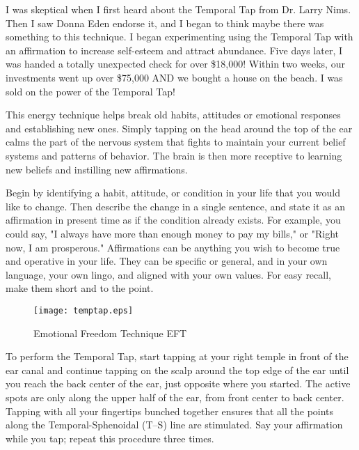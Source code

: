 \documentclass[../main.tex]{subfiles}
\begin{document}
\label{Ex:EFT}
I was skeptical when I first heard about the Temporal Tap from Dr. Larry Nims.
Then I saw Donna Eden endorse it, and I began to think maybe there was something to this technique.
I began experimenting using the Temporal Tap with an affirmation to increase self-esteem and attract abundance.
Five days later, I was handed a totally unexpected check for over \$18,000! Within two weeks, our investments went up over \$75,000 AND we bought a house on the beach.
I was sold on the power of the Temporal Tap!

This energy technique helps break old habits, attitudes
or emotional responses and establishing new ones.   
Simply tapping on the head around the top of the ear calms the part of the nervous system that fights to maintain
your current belief systems and patterns of behavior.
The brain is then more receptive to learning new beliefs and instilling new affirmations.

Begin by identifying a habit, attitude, or condition in your life that you would like to change.
Then describe the change in a single sentence, and state it as an affirmation in present time as if the condition already exists.
For example, you could say, "I always have more than enough money to pay my bills," or "Right now, I am prosperous."
Affirmations can be anything you wish to become true and operative in your life.
They can be specific or general, and in your own language, your own lingo, and aligned with your own values.
For easy recall, make them short and to the point.

\begin{figure}[htb]
  \centering
 \texttt{[image: temptap.eps]}      
\caption{Emotional Freedom Technique EFT}
\end{figure}

To perform the Temporal Tap, start tapping at your right temple in front of the ear canal and continue tapping on the scalp around the top edge of the ear
until you reach the back center of the ear, just opposite where you started.
The active spots are only along the upper half of the ear, from front center to back center.
Tapping with all your fingertips bunched together ensures that all the points along the Temporal-Sphenoidal (T--S) line are stimulated.
Say your affirmation while you tap; repeat this procedure three times.
\end{document}

